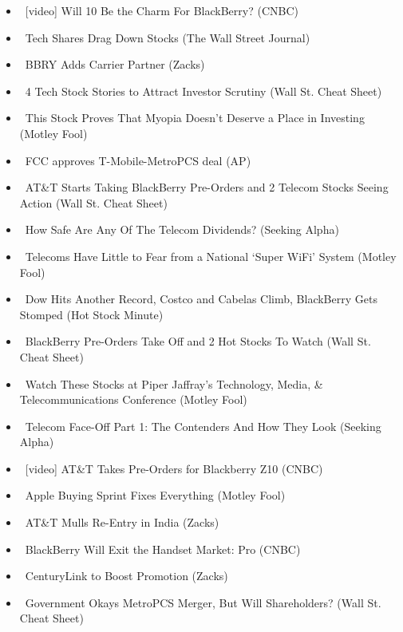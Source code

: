 \documentclass[11pt,asymmetric]{article}
\begin{document}
\begin{itemize}
\item\ [video] Will 10 Be the Charm For BlackBerry? (CNBC)
\item\ Tech Shares Drag Down Stocks (The Wall Street Journal)
\item\ BBRY Adds Carrier Partner (Zacks)
\item\ 4 Tech Stock Stories to Attract Investor Scrutiny (Wall St. Cheat Sheet)
\item\ This Stock Proves That Myopia Doesn’t Deserve a Place in Investing (Motley Fool)
\item\ FCC approves T-Mobile-MetroPCS deal (AP)
\item\ AT\&T Starts Taking BlackBerry Pre-Orders and 2 Telecom Stocks Seeing Action (Wall St. Cheat Sheet)
\item\ How Safe Are Any Of The Telecom Dividends? (Seeking Alpha)
\item\ Telecoms Have Little to Fear from a National `Super WiFi' System (Motley Fool)
\item\ Dow Hits Another Record, Costco and Cabelas Climb, BlackBerry Gets Stomped (Hot Stock Minute)
\item\ BlackBerry Pre-Orders Take Off and 2 Hot Stocks To Watch (Wall St. Cheat Sheet)
\item\ Watch These Stocks at Piper Jaffray's Technology, Media, \& Telecommunications Conference (Motley Fool)
\item\ Telecom Face-Off Part 1: The Contenders And How They Look (Seeking Alpha)
\item\ [video] AT\&T Takes Pre-Orders for Blackberry Z10 (CNBC)
\item\ Apple Buying Sprint Fixes Everything (Motley Fool)
\item\ AT\&T Mulls Re-Entry in India (Zacks)
\item\ BlackBerry Will Exit the Handset Market: Pro (CNBC)
\item\ CenturyLink to Boost Promotion (Zacks)
\item\ Government Okays MetroPCS Merger, But Will Shareholders? (Wall St. Cheat Sheet)
\end{itemize}
\end{document}
